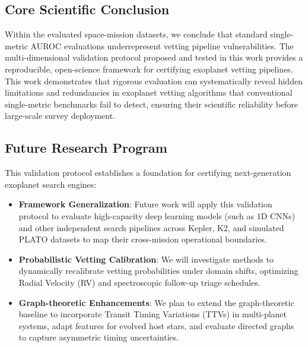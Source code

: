 \subsection{Core Scientific Conclusion} \label{sec:concl_core}
Within the evaluated space-mission datasets, we conclude that standard single-metric AUROC evaluations underrepresent vetting pipeline vulnerabilities. The multi-dimensional validation protocol proposed and tested in this work provides a reproducible, open-science framework for certifying exoplanet vetting pipelines. This work demonstrates that rigorous evaluation can systematically reveal hidden limitations and redundancies in exoplanet vetting algorithms that conventional single-metric benchmarks fail to detect, ensuring their scientific reliability before large-scale survey deployment.

\subsection{Future Research Program} \label{sec:concl_future}
This validation protocol establishes a foundation for certifying next-generation exoplanet search engines:
\begin{itemize}
\item \textbf{Framework Generalization}: Future work will apply this validation protocol to evaluate high-capacity deep learning models (such as 1D CNNs) and other independent search pipelines across Kepler, K2, and simulated PLATO datasets to map their cross-mission operational boundaries.
\item \textbf{Probabilistic Vetting Calibration}: We will investigate methods to dynamically recalibrate vetting probabilities under domain shifts, optimizing Radial Velocity (RV) and spectroscopic follow-up triage schedules.
\item \textbf{Graph-theoretic Enhancements}: We plan to extend the graph-theoretic baseline to incorporate Transit Timing Variations (TTVs) in multi-planet systems, adapt features for evolved host stars, and evaluate directed graphs to capture asymmetric timing uncertainties.
\end{itemize}

